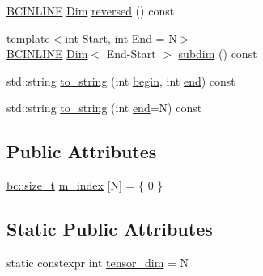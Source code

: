 \begin{DoxyCompactItemize}
\item 
\hyperlink{common_8h_a6699e8b0449da5c0fafb878e59c1d4b1}{B\+C\+I\+N\+L\+I\+NE} \hyperlink{structbc_1_1Dim}{Dim} \hyperlink{structbc_1_1Dim_aab0559a558d0b7188beb2f8c811f150d}{reversed} () const
\item 
{\footnotesize template$<$int Start, int End = N$>$ }\\\hyperlink{common_8h_a6699e8b0449da5c0fafb878e59c1d4b1}{B\+C\+I\+N\+L\+I\+NE} \hyperlink{structbc_1_1Dim}{Dim}$<$ End-\/Start $>$ \hyperlink{structbc_1_1Dim_a3f58e386c1ed1adf4b1a23ba35f7ac7f}{subdim} () const
\item 
std\+::string \hyperlink{structbc_1_1Dim_abd0f93efda4f8a22e86c236e7d4baa1b}{to\+\_\+string} (int \hyperlink{structbc_1_1Dim_ad382835256ceedd117733b1676a6bd3e}{begin}, int \hyperlink{structbc_1_1Dim_ae4ac30383a187b53ca218e7fe15fcc5d}{end}) const
\item 
std\+::string \hyperlink{structbc_1_1Dim_a3e4e7c09e50367be33dd2efb5eaedf52}{to\+\_\+string} (int \hyperlink{structbc_1_1Dim_ae4ac30383a187b53ca218e7fe15fcc5d}{end}=N) const
\end{DoxyCompactItemize}
\subsection*{Public Attributes}
\begin{DoxyCompactItemize}
\item 
\hyperlink{namespacebc_aaf8e3fbf99b04b1b57c4f80c6f55d3c5}{bc\+::size\+\_\+t} \hyperlink{structbc_1_1Dim_aae2f270b732a93eb573ecba26afc26e4}{m\+\_\+index} \mbox{[}N\mbox{]} = \{ 0 \}
\end{DoxyCompactItemize}
\subsection*{Static Public Attributes}
\begin{DoxyCompactItemize}
\item 
static constexpr int \hyperlink{structbc_1_1Dim_a455eafab67c78cbb89905397f50c6824}{tensor\+\_\+dim} = N
\end{DoxyCompactItemize}
